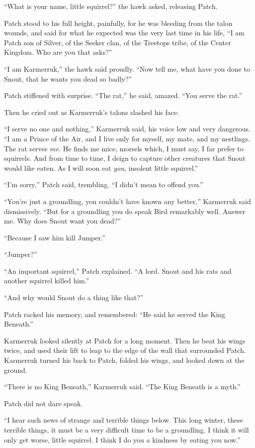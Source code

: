 \documentclass[12pt]{memoir}
\begin{document}
“What is your name, little squirrel?” the hawk asked, releasing Patch.

Patch stood to his full height, painfully, for he was bleeding from
the talon wounds, and said for what he expected was the very last time
in his life, “I am Patch son of Silver, of the Seeker clan, of the
Treetops tribe, of the Center Kingdom. Who are you that asks?”

“I am Karmerruk,” the hawk said proudly. “Now tell me, what have you
done to Snout, that he wants you dead so badly?”

Patch stiffened with surprise. “The rat,” he said, amazed. “You serve
the rat.”

Then he cried out as Karmerruk’s talons slashed his face.

“I serve no one and nothing,” Karmerruk said, his voice low and very
dangerous. “I am a Prince of the Air, and I live only for myself, my
mate, and my nestlings. The rat serves \textit{me.} He finds me mice,
morsels which, I must say, I far prefer to squirrels. And from time to
time, I deign to capture other creatures that Snout would like
eaten. As I will soon eat \textit{you,} insolent little squirrel.”

“I’m sorry,” Patch said, trembling. “I didn’t mean to offend you.”

“You’re just a groundling, you couldn’t have known any better,”
Karmerruk said dismissively. “But for a groundling you do speak Bird
remarkably well. Answer me. Why does Snout want you dead?”

“Because I saw him kill Jumper.”

“Jumper?”

“An important squirrel,” Patch explained. “A lord. Snout and his rats
and another squirrel killed him.”

“And why would Snout do a thing like that?”

Patch racked his memory, and remembered: “He said he served the King
Beneath.”

Karmerruk looked silently at Patch for a long moment. Then he beat his
wings twice, and used their lift to leap to the edge of the wall that
surrounded Patch. Karmerruk turned his back to Patch, folded his
wings, and looked down at the ground.

“There is no King Beneath,” Karmerruk said. “The King Beneath is a
myth.”

Patch did not dare speak.

“I hear such news of strange and terrible things below. This long
winter, these terrible things, it must be a very difficult time to be
a groundling. I think it will only get worse, little squirrel. I think
I do you a kindness by eating you now.”
\end{document}
